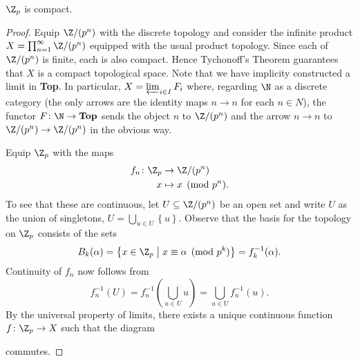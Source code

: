 \documentclass[10pt]{amsart}
\begin{document}
\begin{thm}
  $\Z_p$ is compact.

  \begin{proof}
    Equip $\Z/(p^n)$ with the discrete topology and consider the infinite product $X = \prod_{n=1}^\infty \Z/(p^n)$ equipped with the usual product topology.
    Since each of $\Z/(p^n)$ is finite, each is also compact.
    Hence Tychonoff's Theorem guarantees that $X$ is a compact topological space.
    Note that we have implicity constructed a limit in {\bf Top}.
    In particular, $X = \varprojlim_{i \in I}F_i$ where, 
    regarding $\N$ as a discrete category (the only arrows are the identity maps $n \rightarrow n$ for each $n \in N$), 
    the functor $F \colon \N \rightarrow {\bf Top}$ sends the object $n$ to $\Z/(p^n)$ 
    and the arrow $n \rightarrow n$ to $\Z/(p^n) \rightarrow \Z/(p^n)$ in the obvious way.
    
    Equip $\Z_p$ with the maps
    \begin{align*}
      f_n \colon \Z_p  &\rightarrow \Z/(p^n)\\
      x &\mapsto x \pmod{p^n}.
    \end{align*}
    To see that these are continuous, let $U \subseteq \Z/(p^n)$ be an open set and write $U$ as the union of singletons, $U = \bigcup_{u \in U}\left\{u\right\}$.
    Observe that the basis for the topology on $\Z_p$ consists of the sets
    $$B_k(\alpha) = \left\{x \in \Z_p \;\middle\vert\; x \equiv \alpha \pmod{p^k}\right\} = f_k^{-1}(\alpha).$$
    Continuity of $f_n$ now follows from $$f_n^{-1}(U) = f_n^{-1}\left(\bigcup_{u \in U} u\right) = \bigcup_{u \in U} f_n^{-1}(u).$$
    By the universal property of limits, there exists a unique continuous function $f \colon \Z_p \rightarrow X$ such that the diagram 
    \begin{center}
    \end{center}  
    commutes.


\end{proof}
\end{thm}
\end{document}
